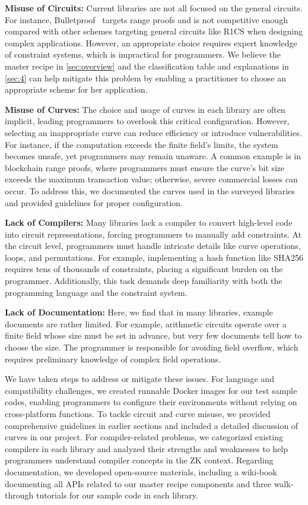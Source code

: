 \documentclass[letterpaper,twocolumn,10pt]{article}
\theoremstyle{definition}
\newcommand{\mypara}[1]{\noindent\textbf{{#1: }}}
\newcommand{\new}[1]{{#1}\xspace}
\newcommand{\news}[1]{{#1}\xspace}
\begin{document}
\mypara{Misuse of Circuits}Current libraries are not all focused on the general circuits. For instance, Bulletproof~\cite{bunz2018bulletproofs} targets range proofs and is not competitive enough compared with other schemes targeting general circuits like R1CS when designing complex applications. However, an appropriate choice requires expert knowledge of constraint systems, which is impractical for programmers. \news{We believe the master recipe in \autoref{sec:overview} and the classification table and explanations in \autoref{sec:4} can help mitigate this problem by enabling a practitioner to choose an appropriate scheme for her application.}

\new{\mypara{Misuse of Curves}The choice and usage of curves in each library are often implicit, leading 
programmers to overlook this critical configuration. However, selecting an inappropriate curve can reduce efficiency or introduce vulnerabilities. For instance, if the computation exceeds the finite field's limits, the system becomes unsafe, yet programmers may remain unaware. A common example is in blockchain range proofs, where programmers must ensure the curve's bit size exceeds the maximum transaction value; otherwise, severe commercial losses can occur. To address this, we documented the curves used in the surveyed libraries and provided guidelines for proper configuration.
}

\mypara{Lack of Compilers}Many libraries lack a compiler to convert high-level code into circuit representations, forcing programmers to manually add constraints. At the circuit level, programmers must handle intricate details like curve operations, loops, and permutations. For example, implementing a hash function like SHA256 requires tens of thousands of constraints, placing a significant burden on the programmer. Additionally, this task demands deep familiarity with both the programming language and the constraint system.

\mypara{Lack of Documentation}Here, we find that in many libraries, example documents are rather limited. For example, arithmetic circuits operate over a finite field whose size must be set in advance, but very few documents tell how to choose the size. The programmer is responsible for avoiding field overflow, which requires preliminary knowledge of complex field operations.

\new{We have taken steps to address or mitigate these issues. For language and compatibility challenges, we created runnable Docker images for our test sample codes, enabling programmers to configure their environments without relying on cross-platform functions. To tackle circuit and curve misuse, we provided comprehensive guidelines in earlier sections and included a detailed discussion of curves in our project. For compiler-related problems, we categorized existing compilers in each library and analyzed their strengths and weaknesses to help programmers understand compiler concepts in the ZK context. Regarding documentation, we developed open-source materials, including a wiki-book documenting all APIs related to our master recipe components and three walk-through tutorials for our sample code in each library.}
\end{document}
